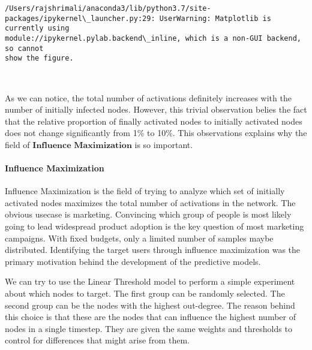 \documentclass[11pt]{article}
\begin{document}
    \begin{Verbatim}[commandchars=\\\{\}]
/Users/rajshrimali/anaconda3/lib/python3.7/site-
packages/ipykernel\_launcher.py:29: UserWarning: Matplotlib is currently using
module://ipykernel.pylab.backend\_inline, which is a non-GUI backend, so cannot
show the figure.
    \end{Verbatim}

    \begin{center}
    \end{center}
    { \hspace*{\fill} \\}
    
    As we can notice, the total number of activations definitely increases
with the number of initially infected nodes. However, this trivial
observation belies the fact that the relative proportion of finally
activated nodes to initially activated nodes does not change
significantly from 1\% to 10\%. This observations explains why the field
of \(\textbf{Influence Maximization}\) is so important.

    \hypertarget{influence-maximization}{%
\paragraph{Influence Maximization}\label{influence-maximization}}

Influence Maximization is the field of trying to analyze which set of
initially activated nodes maximizes the total number of activations in
the network. The obvious usecase is marketing. Convincing which group of
people is most likely going to lead widespread product adoption is the
key question of most marketing campaigns. With fixed budgets, only a
limited number of samples maybe distributed. Identifying the target
users through influence maximization was the primary motivation behind
the development of the predictive models.

    We can try to use the Linear Threshold model to perform a simple
experiment about which nodes to target. The first group can be randomly
selected. The second group can be the nodes with the highest out-degree.
The reason behind this choice is that these are the nodes that can
influence the highest number of nodes in a single timestep. They are
given the same weights and thresholds to control for differences that
might arise from them.
\end{document}
